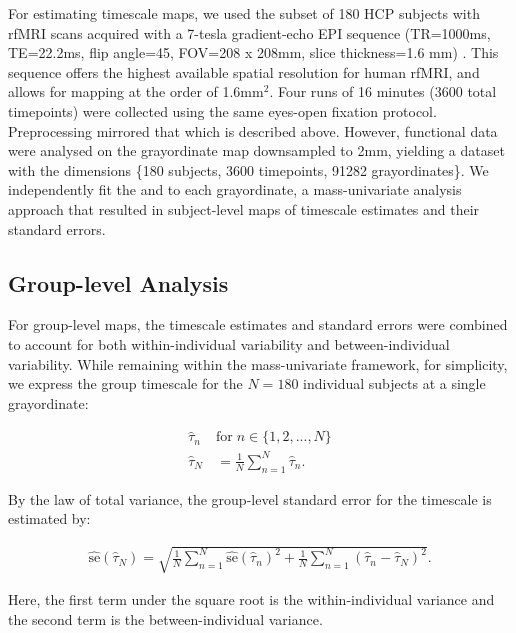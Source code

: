\documentclass[main.tex]{subfiles}
\begin{document}
For estimating timescale maps, we used the subset of 180 HCP subjects with rfMRI scans acquired with a 7-tesla gradient-echo EPI sequence (TR=1000ms, TE=22.2ms, flip angle=45\textdegree, FOV=208 x 208mm, slice thickness=1.6 mm) \citep{van_essen_wu-minn_2013, moeller_multiband_2010}. This sequence offers the highest available spatial resolution for human rfMRI, and allows for mapping at the order of 1.6mm$^2$. Four runs of 16 minutes (3600 total timepoints) were collected using the same eyes-open fixation protocol. Preprocessing mirrored that which is described above. However, functional data were analysed on the grayordinate map downsampled to 2mm, yielding a dataset with the dimensions \{180 subjects, 3600 timepoints, 91282 grayordinates\}. We independently fit the  and  to each grayordinate, a mass-univariate analysis approach that resulted in subject-level maps of timescale estimates and their standard errors.\\

\subsection{Group-level Analysis}\label{sec:group-level-analysis}
For group-level maps, the timescale estimates and standard errors were combined to account for both within-individual variability and between-individual variability. While remaining within the mass-univariate framework, for simplicity, we express the group timescale for the $N=180$ individual subjects at a single grayordinate:

\begin{align}
    \hat\tau_n \; &\text{for} \; n\in\{1, 2, ..., N\}\\
    \hat\tau_N &= \frac{1}{N} \sum_{n=1}^N \hat\tau_n.
\end{align}

\noindent By the law of total variance, the group-level standard error for the timescale is estimated by:

\begin{align}
    \widehat{\text{se}}(\hat\tau_N) = \sqrt{\frac{1}{N} \sum_{n=1}^N \widehat{\text{se}}(\hat\tau_n)^2 + \frac{1}{N} \sum_{n=1}^N (\hat\tau_n - \hat\tau_N)^2}.
\end{align}

\noindent Here, the first term under the square root is the within-individual variance and the second term is the between-individual variance.\\
\end{document}
